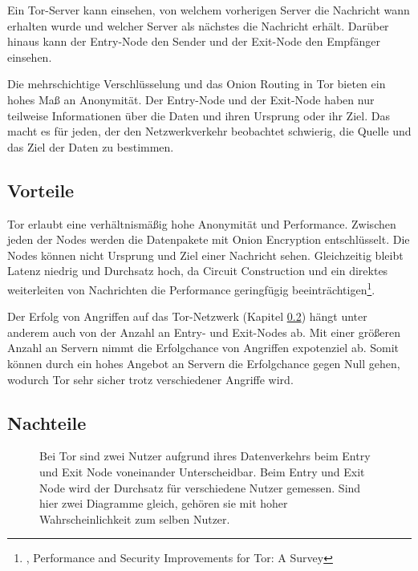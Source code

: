 Ein Tor-Server kann einsehen, von welchem vorherigen Server die Nachricht wann erhalten wurde und welcher Server als nächstes die Nachricht erhält. Darüber hinaus kann der Entry-Node den Sender und der Exit-Node den Empfänger einsehen.

Die mehrschichtige Verschlüsselung und das Onion Routing in Tor bieten ein hohes Maß an Anonymität. Der Entry-Node und der Exit-Node haben nur teilweise Informationen über die Daten und ihren Ursprung oder ihr Ziel. Das macht es für jeden, der den Netzwerkverkehr beobachtet schwierig, die Quelle und das Ziel der Daten zu bestimmen\footnotemark{}.

\subsection{Vorteile}
\label{chap:tor_advantages}

Tor erlaubt eine verhältnismäßig hohe Anonymität und Performance. Zwischen jeden der Nodes werden die Datenpakete mit Onion Encryption entschlüsselt. Die Nodes können nicht Ursprung und Ziel einer Nachricht sehen. Gleichzeitig bleibt Latenz niedrig und Durchsatz hoch, da Circuit Construction und ein direktes weiterleiten von Nachrichten die Performance geringfügig beeinträchtigen\footnote{\cite{PerformanceAndSecurityTor}, Performance and Security Improvements for Tor: A Survey}.

Der Erfolg von Angriffen auf das Tor-Netzwerk (Kapitel \ref{chap:tor_disatvantages}) hängt unter anderem auch von der Anzahl an Entry- und Exit-Nodes ab. Mit einer größeren Anzahl an Servern nimmt die Erfolgchance von Angriffen expotenziel ab. Somit können durch ein hohes Angebot an Servern die Erfolgchance gegen Null gehen, wodurch Tor sehr sicher trotz verschiedener Angriffe wird.

\subsection{Nachteile}
\label{chap:tor_disatvantages}

\begin{figure}[h!]
    \centering
    
    \caption{Bei Tor sind zwei Nutzer aufgrund ihres Datenverkehrs beim Entry und Exit Node voneinander Unterscheidbar. Beim Entry und Exit Node wird der Durchsatz für verschiedene Nutzer gemessen. Sind hier zwei Diagramme gleich, gehören sie mit hoher Wahrscheinlichkeit zum selben Nutzer.}
    \label{imgs:tor_transfer}
\end{figure}

